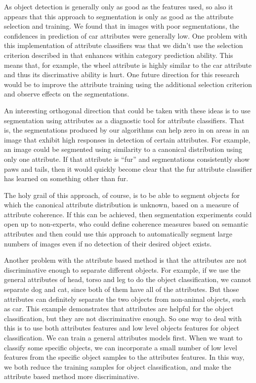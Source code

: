 \documentclass[10pt,twocolumn,letterpaper]{article}
\begin{document}
As object detection is generally only as good as the features used, so also it
appears that this approach to segmentation is only as good as the attribute
selection and training.  We found that in images with poor segmentations, the
confidences in prediction of car attributes were generally low.  One problem
with this implementation of attribute classifiers was that we didn't use
the selection criterion described in \cite{farhadi09} that enhances within
category prediction ability.  This means that, for example, the wheel attribute
is highly similar to the car attribute and thus its discrimative ability
is hurt.  One future direction for this research would be to improve the attribute
training using the additional selection criterion and observe effects on
the segmentations.

An interesting orthogonal direction that could be taken with these ideas is to
use segmentation using attributes as a diagnostic tool for attribute classifiers.
That is, the segmentations produced by our algorithms can help zero in on areas
in an image that exhibit high responses in detection of certain attributes.
For example, an image could be segmented using similarity to a canonical distribution
using only one attribute.  If that attribute is ``fur'' and segmentations
consistently show paws and tails, then it would quickly become clear that
the fur attribute classifier has learned on something other than fur.

The holy grail of this approach, of course, is to be able to segment objects
for which the canonical attribute distribution is unknown, based on a measure
of attribute coherence.  If this can be achieved, then segmentation experiments
could open up to non-experts, who could define coherence measures based on
semantic attributes and then could use this approach to automatically segment large
numbers of images even if no detection of their desired object exists.

Another problem with the attribute based method is that the attributes are not discriminative 
enough to separate different objects. For example, if we use the general attributes of head, torso and leg to 
do the object classification, we cannot separate dog and cat, since both of them have all of the attributes. 
But those attributes can definitely separate the two objects from non-animal objects, such as car. This example demonstrates that 
attributes are helpful for the object classification, but they are not discriminative enough. So one way to deal with this is to use 
both attributes features and low level objects features for object classification. We can train a general attributes models first. 
When we want to classify some specific objects, we can incorporate a small number of low level features from the specific object samples to the attributes 
features. In this way, we both reduce the training samples for object classification, and make the attribute based method more discriminative.
\end{document}

